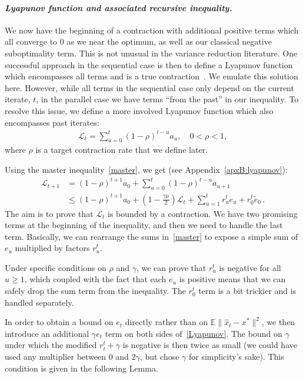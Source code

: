 \documentclass[twoside, 11pt]{article}
\newcommand{\stepsize}{\gamma}
\newcommand{\strongconvex}{\mu}
\newcommand{\contraction}{\rho}
\newcommand{\lyapunov}{\mathcal{L}}
\newcommand{\E}{\mathbb{E}}
\begin{document}
\paragraph{\textit{Lyapunov function and associated recursive inequality.}}
We now have the beginning of a contraction with additional positive terms which all converge to $0$ as we near the optimum, as well as our classical negative suboptimality term.
This is not unusual in the variance reduction literature. One successful approach in the sequential case is then to define a Lyapunov function which encompasses all terms and is a true contraction~\citep[see][]{SAGA, qsaga}.
We emulate this solution here.
However, while all terms in the sequential case only depend on the current iterate, $t$, in the parallel case we have terms ``from the past'' in our inequality.
To resolve this issue, we define a more involved Lyapunov function which also encompasses past iterates:
\begin{align} \label{eq:LyapunovDefinition}
\lyapunov_t = \sum_{u=0}^t (1-\contraction)^{t-u}a_u, \quad 0<\contraction < 1,
\end{align}
where $\contraction$ is a target contraction rate that we define later.

Using the master inequality~\eqref{master}, we get (see Appendix~\ref{apxB:lyapunov}):
\begin{align}\label{Lyapunov}
\lyapunov_{t+1}
&= (1 - \contraction)^{t+1}a_0
+ \sum_{u=0}^t(1 - \contraction)^{t-u}a_{u+1}
\nonumber \\
&\leq (1 - \contraction)^{t+1}a_0 + (1-\frac{\stepsize\strongconvex}{2})\lyapunov_t + \sum_{u=1}^t r_u^t e_u + r_0^t \tilde e_0  \, .
\end{align}
The aim is to prove that $\lyapunov_t$ is bounded by a contraction.
We have two promising terms at the beginning of the inequality, and then we need to handle the last term.
Basically, we can rearrange the sums in~\eqref{master} to expose a simple sum of $e_u$ multiplied by factors $r_u^t$.

Under specific conditions on $\contraction$ and $\stepsize$, we can prove that $r_u^t$ is negative for all $u \geq 1$, which coupled with the fact that each $e_u$ is positive means that we can safely drop the sum term from the inequality.
The $r_0^t$ term is a bit trickier and is handled separately.

In order to obtain a bound on $e_t$ directly rather than on $\E \|\hat x_t - x^*\|^2$, we then introduce an additional $\stepsize e_t$ term on both sides of~\eqref{Lyapunov}.
The bound on $\stepsize$ under which the modified $r_t^t + \stepsize$ is negative is then twice as small (we could have used any multiplier between $0$ and $2\stepsize$, but chose $\stepsize$ for simplicity's sake).
This condition is given in the following Lemma.
\end{document}
